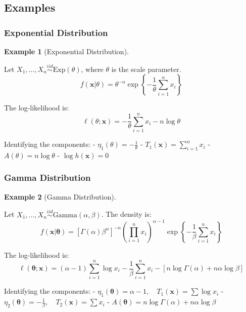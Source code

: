 \documentclass[
  letterpaper,
  DIV=11,
  numbers=noendperiod]{scrreprt}
\renewcommand{\[}{\begin{equation}}
\renewcommand{\]}{\end{equation}}
\theoremstyle{definition}
\theoremstyle{plain}
\theoremstyle{plain}
\theoremstyle{plain}
\theoremstyle{definition}
\newtheorem{example}{Example}[chapter]
\theoremstyle{plain}
\theoremstyle{remark}
\begin{document}
\subsection{Examples}\label{examples-1}

\subsubsection*{Exponential
Distribution}\label{exponential-distribution}

\begin{example}[Exponential
Distribution]\protect\hypertarget{exm-exponential-dist}{}\label{exm-exponential-dist}

Let \(X_1, \dots, X_n \overset{iid}{\sim} \text{Exp}(\theta)\), where
\(\theta\) is the scale parameter. \[
f(\mathbf{x}|\theta) = \theta^{-n} \exp\left\{ -\frac{1}{\theta} \sum_{i=1}^n x_i \right\}
\]

The log-likelihood is: \[
\ell(\theta; \mathbf{x}) = -\frac{1}{\theta} \sum_{i=1}^n x_i - n \log \theta
\]

Identifying the components: - \(\eta_1(\theta) = -\frac{1}{\theta}\) -
\(T_1(\mathbf{x}) = \sum_{i=1}^n x_i\) - \(A(\theta) = n \log \theta\) -
\(\log h(\mathbf{x}) = 0\)

\end{example}

\subsubsection*{Gamma Distribution}\label{gamma-distribution-1}

\begin{example}[Gamma
Distribution]\protect\hypertarget{exm-gamma-dist}{}\label{exm-gamma-dist}

Let \(X_1, \dots, X_n \overset{iid}{\sim} \text{Gamma}(\alpha, \beta)\).
The density is: \[
f(\mathbf{x}|\boldsymbol{\theta}) = [\Gamma(\alpha)\beta^\alpha]^{-n} \left( \prod_{i=1}^n x_i \right)^{\alpha-1} \exp\left\{ -\frac{1}{\beta} \sum_{i=1}^n x_i \right\}
\]

The log-likelihood is: \[
\ell(\boldsymbol{\theta}; \mathbf{x}) = (\alpha-1) \sum_{i=1}^n \log x_i - \frac{1}{\beta} \sum_{i=1}^n x_i - \left[ n \log \Gamma(\alpha) + n\alpha \log \beta \right]
\]

Identifying the components: -
\(\eta_1(\boldsymbol{\theta}) = \alpha - 1, \quad T_1(\mathbf{x}) = \sum \log x_i\)
-
\(\eta_2(\boldsymbol{\theta}) = -\frac{1}{\beta}, \quad T_2(\mathbf{x}) = \sum x_i\)
-
\(A(\boldsymbol{\theta}) = n \log \Gamma(\alpha) + n\alpha \log \beta\)

\end{example}
\end{document}
